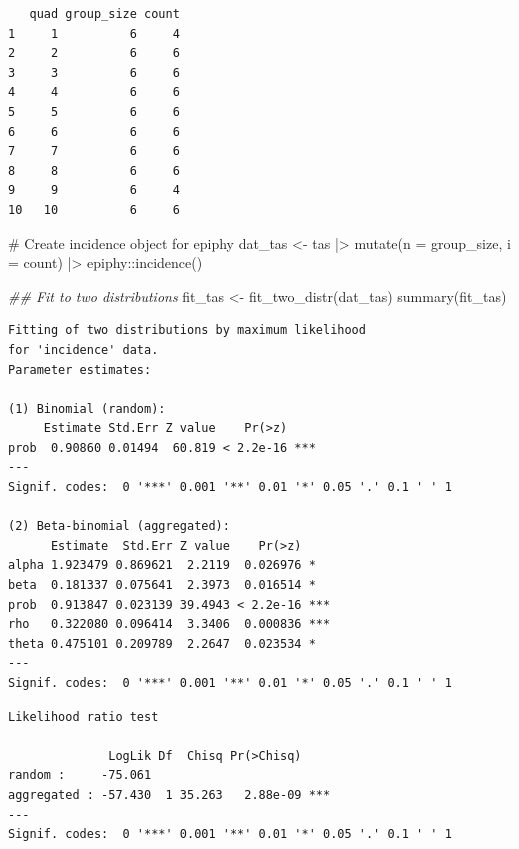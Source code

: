\documentclass[
  letterpaper,
]{book}
\newenvironment{Shaded}{\begin{snugshade}}{\end{snugshade}}
\newcommand{\AttributeTok}[1]{\textcolor[rgb]{0.40,0.45,0.13}{#1}}
\newcommand{\CommentTok}[1]{\textcolor[rgb]{0.37,0.37,0.37}{#1}}
\newcommand{\DocumentationTok}[1]{\textcolor[rgb]{0.37,0.37,0.37}{\textit{#1}}}
\newcommand{\FunctionTok}[1]{\textcolor[rgb]{0.28,0.35,0.67}{#1}}
\newcommand{\NormalTok}[1]{\textcolor[rgb]{0.00,0.23,0.31}{#1}}
\newcommand{\OtherTok}[1]{\textcolor[rgb]{0.00,0.23,0.31}{#1}}
\newcommand{\SpecialCharTok}[1]{\textcolor[rgb]{0.37,0.37,0.37}{#1}}
\begin{document}
\begin{verbatim}
   quad group_size count
1     1          6     4
2     2          6     6
3     3          6     6
4     4          6     6
5     5          6     6
6     6          6     6
7     7          6     6
8     8          6     6
9     9          6     4
10   10          6     6
\end{verbatim}

\begin{Shaded}
\begin{Highlighting}[]
\CommentTok{\# Create incidence object for epiphy}
\NormalTok{dat\_tas }\OtherTok{\textless{}{-}}\NormalTok{ tas }\SpecialCharTok{|\textgreater{}}
  \FunctionTok{mutate}\NormalTok{(}\AttributeTok{n =}\NormalTok{ group\_size, }\AttributeTok{i =}\NormalTok{ count) }\SpecialCharTok{|\textgreater{}}
\NormalTok{  epiphy}\SpecialCharTok{::}\FunctionTok{incidence}\NormalTok{()}

\DocumentationTok{\#\# Fit to two distributions}
\NormalTok{fit\_tas }\OtherTok{\textless{}{-}} \FunctionTok{fit\_two\_distr}\NormalTok{(dat\_tas)}
\FunctionTok{summary}\NormalTok{(fit\_tas)}
\end{Highlighting}
\end{Shaded}

\begin{verbatim}
Fitting of two distributions by maximum likelihood
for 'incidence' data.
Parameter estimates:

(1) Binomial (random):
     Estimate Std.Err Z value    Pr(>z)    
prob  0.90860 0.01494  60.819 < 2.2e-16 ***
---
Signif. codes:  0 '***' 0.001 '**' 0.01 '*' 0.05 '.' 0.1 ' ' 1

(2) Beta-binomial (aggregated):
      Estimate  Std.Err Z value    Pr(>z)    
alpha 1.923479 0.869621  2.2119  0.026976 *  
beta  0.181337 0.075641  2.3973  0.016514 *  
prob  0.913847 0.023139 39.4943 < 2.2e-16 ***
rho   0.322080 0.096414  3.3406  0.000836 ***
theta 0.475101 0.209789  2.2647  0.023534 *  
---
Signif. codes:  0 '***' 0.001 '**' 0.01 '*' 0.05 '.' 0.1 ' ' 1
\end{verbatim}

\begin{Shaded}
\end{Shaded}

\begin{verbatim}
Likelihood ratio test

              LogLik Df  Chisq Pr(>Chisq)    
random :     -75.061                         
aggregated : -57.430  1 35.263   2.88e-09 ***
---
Signif. codes:  0 '***' 0.001 '**' 0.01 '*' 0.05 '.' 0.1 ' ' 1
\end{verbatim}
\end{document}
